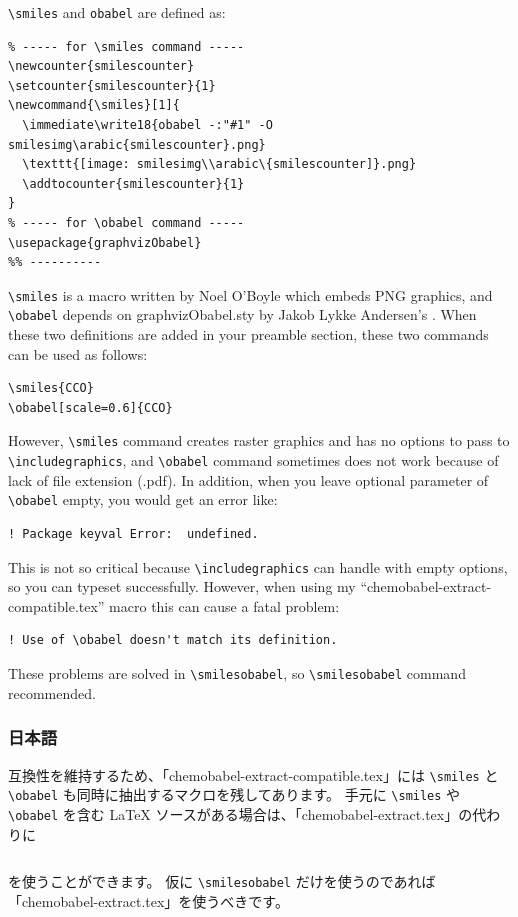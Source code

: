 \documentclass[12pt]{jsarticle}
\begin{document}
\verb|\smiles| and \verb|obabel| are defined as:
\begin{verbatim}
% ----- for \smiles command -----
\newcounter{smilescounter}
\setcounter{smilescounter}{1}
\newcommand{\smiles}[1]{
  \immediate\write18{obabel -:"#1" -O smilesimg\arabic{smilescounter}.png}
  \texttt{[image: smilesimg\\arabic\{smilescounter]}.png}
  \addtocounter{smilescounter}{1}
}
% ----- for \obabel command -----
\usepackage{graphvizObabel}
%% ----------
\end{verbatim}

\verb|\smiles| is a macro written by Noel O'Boyle \cite{NOB1} which embeds PNG graphics, and \verb|\obabel| depends on \textsf{graphvizObabel.sty} by Jakob Lykke Andersen's \cite{JLA}.
When these two definitions are added in your preamble section, these two commands can be used as follows:
\begin{verbatim}
\smiles{CCO}
\obabel[scale=0.6]{CCO}
\end{verbatim}
However, \verb|\smiles| command creates raster graphics and has no options to pass to \verb|\includegraphics|, and \verb|\obabel| command sometimes does not work because of lack of file extension (.pdf). In addition, when you leave optional parameter of \verb|\obabel| empty, you would get an error like:
\begin{verbatim}
! Package keyval Error:  undefined.
\end{verbatim}
This is not so critical because \verb|\includegraphics| can handle with empty options, so you can typeset successfully.
However, when using my ``chemobabel-extract-compatible.tex'' macro this can cause a fatal problem:
\begin{verbatim}
! Use of \obabel doesn't match its definition.
\end{verbatim}
These problems are solved in \verb|\smilesobabel|, so \verb|\smilesobabel| command recommended.

\subsubsection{日本語}

互換性を維持するため、「chemobabel-extract-compatible.tex」には \verb|\smiles| と \verb|\obabel| も同時に抽出するマクロを残してあります。
手元に \verb|\smiles| や \verb|\obabel| を含む {\LaTeX} ソースがある場合は、「chemobabel-extract.tex」の代わりに
\begin{verbatim}

\end{verbatim}
を使うことができます。
仮に \verb|\smilesobabel| だけを使うのであれば「chemobabel-extract.tex」を使うべきです。
\end{document}
